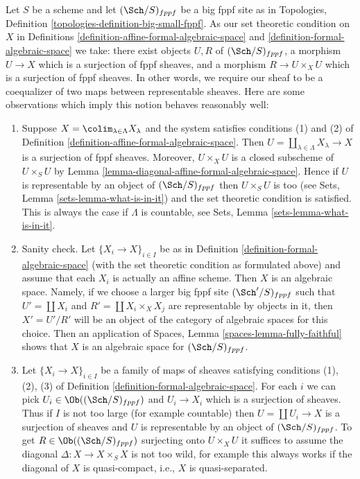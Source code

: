 \begin{remark}
\label{remark-set-theoretic}
Let $S$ be a scheme and let $(\Sch/S)_{fppf}$ be a big fppf site as
in Topologies, Definition \ref{topologies-definition-big-small-fppf}.
As our set theoretic condition on $X$ in
Definitions \ref{definition-affine-formal-algebraic-space} and
\ref{definition-formal-algebraic-space} we take:
there exist objects $U, R$ of $(\Sch/S)_{fppf}$, a
morphism $U \to X$ which is a surjection of fppf sheaves, and
a morphism $R \to U \times_X U$ which is a surjection of fppf sheaves.
In other words, we require our sheaf to be a coequalizer of
two maps between representable sheaves.
Here are some observations which imply this notion behaves
reasonably well:
\begin{enumerate}
\item Suppose $X = \colim_{\lambda \in \Lambda} X_\lambda$
and the system satisfies conditions (1) and (2) of
Definition \ref{definition-affine-formal-algebraic-space}. Then
$U = \coprod_{\lambda \in \Lambda} X_\lambda \to X$ is a surjection
of fppf sheaves. Moreover, $U \times_X U$ is a closed subscheme
of $U \times_S U$ by Lemma \ref{lemma-diagonal-affine-formal-algebraic-space}.
Hence if $U$ is representable by an object of $(\Sch/S)_{fppf}$
then $U \times_S U$ is too (see Sets, Lemma \ref{sets-lemma-what-is-in-it})
and the set theoretic condition is satisfied. This is always the case
if $\Lambda$ is countable, see Sets, Lemma \ref{sets-lemma-what-is-in-it}.
\item Sanity check. Let $\{X_i \to X\}_{i \in I}$ be as in
Definition \ref{definition-formal-algebraic-space}
(with the set theoretic condition as formulated above)
and assume that each $X_i$ is actually an affine scheme.
Then $X$ is an algebraic space. Namely, if we choose a larger
big fppf site $(\Sch'/S)_{fppf}$ such that $U' = \coprod X_i$
and $R' = \coprod X_i \times_X X_j$ are representable by objects
in it, then $X' = U'/R'$ will be an object of the category
of algebraic spaces for this choice. Then an application of
Spaces, Lemma \ref{spaces-lemma-fully-faithful} shows that
$X$ is an algebraic space for $(\Sch/S)_{fppf}$.
\item Let $\{X_i \to X\}_{i \in I}$ be a family of maps of sheaves
satisfying conditions (1), (2), (3) of
Definition \ref{definition-formal-algebraic-space}.
For each $i$ we can pick $U_i \in \Ob((\Sch/S)_{fppf})$
and $U_i \to X_i$ which is a surjection of sheaves.
Thus if $I$ is not too large (for example countable) then
$U = \coprod U_i \to X$ is a surjection of sheaves and
$U$ is representable by an object of $(\Sch/S)_{fppf}$.
To get $R \in \Ob((\Sch/S)_{fppf})$ surjecting onto $U \times_X U$
it suffices to assume the diagonal $\Delta : X \to X \times_S X$ is not
too wild, for example this always works if the diagonal of $X$ is
quasi-compact, i.e., $X$ is quasi-separated.
\end{enumerate}
\end{remark}






